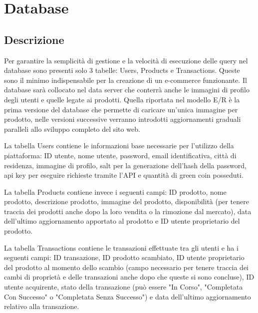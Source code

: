 \section{Database}
\subsection{Descrizione}
Per garantire la semplicità di gestione e la velocità di esecuzione delle query nel database sono presenti solo 3 tabelle: Users, Products e Transactions. Queste sono il minimo indispensabile per la creazione di un e-commerce funzionante. Il database sarà collocato nel data server che conterrà anche le immagini di profilo degli utenti e quelle legate ai prodotti. Quella riportata nel modello E/R è la prima versione del database che permette di caricare un'unica immagine per prodotto, nelle versioni successive verranno introdotti aggiornamenti graduali paralleli allo sviluppo completo del sito web. 
\medskip

La tabella Users contiene le informazioni base necessarie per l'utilizzo della piattaforma: ID utente, nome utente, password, email identificativa, città di residenza, immagine di profilo, salt per la generazione dell'hash della password, api key per eseguire richieste tramite l'API e quantità di green coin posseduti. 
\medskip

La tabella Products contiene invece i seguenti campi: ID prodotto, nome prodotto, descrizione prodotto, immagine del prodotto, disponibilità (per tenere traccia dei prodotti anche dopo la loro vendita o la rimozione dal mercato), data dell'ultimo aggiornamento apportato al prodotto e ID utente proprietario del prodotto. 
\medskip

La tabella Transactions contiene le transazioni effettuate tra gli utenti e ha i seguenti campi: ID transazione, ID prodotto scambiato, ID utente proprietario del prodotto al momento dello scambio (campo necessario per tenere traccia dei cambi di proprietà e delle transazioni anche dopo che queste si sono concluse), ID utente acquirente, stato della transazione (può essere "In Corso", "Completata Con Successo" o "Completata Senza Successo") e data dell'ultimo aggiornamento relativo alla transazione. 
